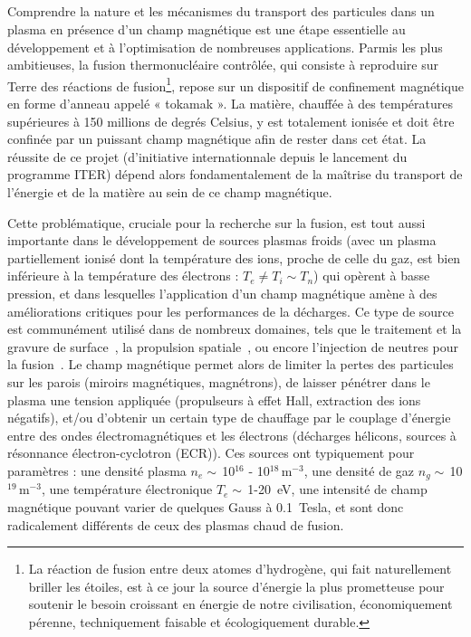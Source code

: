 
\begin{refsection}

\section*{}
Comprendre la nature et les mécanismes du transport des particules dans un
plasma en présence d'un champ magnétique est une étape essentielle au
développement et à l'optimisation de nombreuses applications.
Parmis les plus ambitieuses, la fusion thermonucléaire contrôlée, qui
consiste à reproduire sur Terre des réactions de fusion\footnote{La réaction de
fusion entre deux atomes d'hydrogène, qui fait naturellement briller les
étoiles, est à ce jour la source d'énergie la plus prometteuse pour soutenir le besoin croissant en énergie de notre civilisation,
économiquement pérenne, techniquement faisable et écologiquement durable.},
repose sur un dispositif de confinement magnétique en forme d'anneau appelé « tokamak ».
La matière, chauffée à des températures supérieures à 150 millions de degrés
Celsius, y est totalement ionisée et doit être confinée par un puissant champ magnétique afin
de rester dans cet état. La réussite de ce projet (d'initiative
internationnale depuis le lancement du programme ITER) dépend alors
fondamentalement de la maîtrise du transport de l'énergie et de la matière au
sein de ce champ magnétique.

Cette problématique, cruciale pour la recherche sur la fusion, est tout aussi
importante dans le développement de sources plasmas froids (avec un plasma
partiellement ionisé dont la température des ions, proche de celle du gaz,
est bien inférieure à la température des électrons : $T_e\neq T_i\sim
T_n$) qui opèrent à basse pression, et dans lesquelles l'application d'un champ
magnétique amène à des améliorations critiques pour les performances de la
décharges. Ce type de source est communément utilisé dans de
nombreux domaines, tels que le traitement et la gravure de
surface~\parencite{Lieberman}, la propulsion spatiale~\parencite{Zhurin}, ou
encore l'injection de neutres pour la fusion~\parencite{SimoninHDR}. Le champ
magnétique permet alors de limiter la pertes des particules sur les parois (miroirs magnétiques,
magnétrons), de laisser pénétrer dans le plasma une tension appliquée
(propulseurs à effet Hall, extraction des ions négatifs), et/ou d'obtenir un
certain type de chauffage par le couplage d'énergie entre des ondes
électromagnétiques et les électrons (décharges hélicons, sources à résonnance
électron-cyclotron (ECR)). Ces sources ont typiquement pour paramètres : une
densité plasma $n_e\sim\,$10$^{16}$ - 10$^{18}\,$m$^{-3}$, une densité de gaz
$n_g\sim\,$10$^{19}\,$m$^{-3}$, une température électronique $T_e\sim\,$1-20~eV,
une intensité de champ magnétique pouvant varier de quelques Gauss à 0.1~Tesla,
et sont donc radicalement différents de ceux des plasmas chaud de fusion.


\end{refsection}
